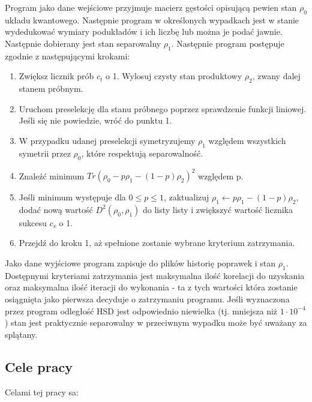 \documentclass[11pt, a4paper]{article}
\begin{document}
\begin{sloppypar}
    Program jako dane wejściowe przyjmuje macierz gęstości opisującą pewien stan
    $\rho_{0}$ układu kwantowego. Następnie program w określonych wypadkach jest w stanie
    wydedukować wymiary podukładów i ich liczbę lub można je podać jawnie. Następnie
    dobierany jest stan separowalny $\rho_{1}$. Następnie program postępuje zgodnie z następującymi
    krokami:

    \begin{enumerate}
      \item Zwiększ licznik prób $c_{t}$ o 1. Wylosuj czysty stan produktowy $\rho_{2}$,
        zwany dalej stanem próbnym.

      \item Uruchom preselekcję dla stanu próbnego poprzez sprawdzenie funkcji liniowej.
        Jeśli się nie powiedzie, wróć do punktu 1.

      \item W przypadku udanej preselekcji symetryzujemy $\rho_{1}$ względem wszystkich symetrii
        przez $\rho_{0}$, które respektują separowalność.

      \item Znaleźć minimum $Tr(\rho_{0}- p\rho_{1}- (1 - p)\rho_{2})^{2}$ względem p.

      \item Jeśli minimum występuje dla $0 \le p \le 1$, zaktualizuj
        $\rho_{1}\leftarrow p\rho_{1}- (1 - p)\rho_{2}$, dodać nową wartość $D^{2}(\rho_{0}
        , \rho_{1})$ do listy listy i zwiększyć wartość licznika sukcesu $c_{s}$ o 1.

      \item Przejdź do kroku 1, aż spełnione zostanie wybrane kryterium zatrzymania.
    \end{enumerate}

    Jako dane wyjściowe program zapisuje do plików historię poprawek i stan $\rho_{1}$. Dostępnymi
    kryteriami zatrzymania jest maksymalna ilość korelacji do uzyskania oraz maksymalna ilość
    iteracji do wykonania - ta z tych wartości która zostanie osiągnięta jako pierwsza decyduje
    o zatrzymaniu programu. Jeśli wyznaczona przez program odległość HSD jest
    odpowiednio niewielka (tj. mniejsza niż $1 \cdot 10^{-4}$) stan jest praktycznie separowalny
    w przeciwnym wypadku może być uważany za splątany.

    \subsection{Cele pracy}
    Celami tej pracy sa:


\end{sloppypar}
\end{document}
